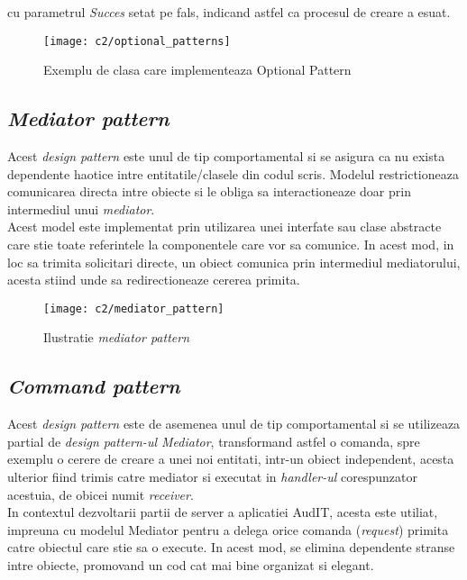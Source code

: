  cu parametrul \textit{Succes} setat pe fals, indicand astfel ca procesul de creare a esuat.\\

\begin{figure}[h]
	\centering
	
	\texttt{[image: c2/optional\_patterns]}
	\caption{Exemplu de clasa care implementeaza Optional Pattern}
\end{figure}

\subsection*{\textit{Mediator pattern}}
Acest \textit{design pattern} este unul de tip comportamental si se asigura ca nu exista dependente haotice intre entitatile/clasele din codul scris. Modelul restrictioneaza comunicarea directa intre obiecte si le obliga sa interactioneaze doar prin intermediul unui \textit{mediator}.\\
Acest model este implementat prin utilizarea unei interfate sau clase abstracte care stie toate referintele la componentele care vor sa comunice. In acest mod, in loc sa trimita solicitari directe, un obiect comunica prin intermediul mediatorului, acesta stiind unde sa redirectioneaze cererea primita.


\begin{figure}[h]
	\centering
	
	\texttt{[image: c2/mediator\_pattern]}
	\caption{Ilustratie \textit{mediator pattern}}
\end{figure}

	\newpage
\subsection*{\textit{Command pattern}}	

Acest \textit{design pattern} este de asemenea unul de tip comportamental si se utilizeaza partial de \textit{design pattern-ul Mediator}, transformand astfel o comanda, spre exemplu o cerere de creare a unei noi entitati, intr-un obiect independent, acesta ulterior fiind trimis catre mediator si executat in \textit{handler-ul} corespunzator acestuia, de obicei numit \textit{receiver}.\\
In contextul dezvoltarii partii de server a aplicatiei AudIT, acesta este utiliat, impreuna cu modelul Mediator pentru a delega orice comanda (\textit{request}) primita catre obiectul care stie sa o execute. In acest mod, se elimina dependente stranse intre obiecte, promovand un cod cat mai bine organizat si elegant.\\

